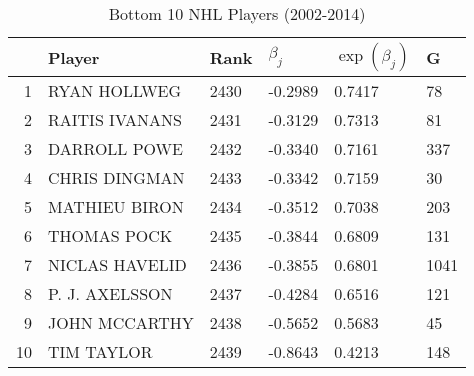 \begin{table}[ht]
\centering
\begin{tabular}{rlllll}
  \hline
 & Player & Rank & $\beta_j$ & $\exp(\beta_j)$ & G \\ 
  \hline
1 & RYAN HOLLWEG & 2430 & -0.2989 & 0.7417 & 78 \\ 
  2 & RAITIS IVANANS & 2431 & -0.3129 & 0.7313 & 81 \\ 
  3 & DARROLL POWE & 2432 & -0.3340 & 0.7161 & 337 \\ 
  4 & CHRIS DINGMAN & 2433 & -0.3342 & 0.7159 & 30 \\ 
  5 & MATHIEU BIRON & 2434 & -0.3512 & 0.7038 & 203 \\ 
  6 & THOMAS POCK & 2435 & -0.3844 & 0.6809 & 131 \\ 
  7 & NICLAS HAVELID & 2436 & -0.3855 & 0.6801 & 1041 \\ 
  8 & P. J. AXELSSON & 2437 & -0.4284 & 0.6516 & 121 \\ 
  9 & JOHN MCCARTHY & 2438 & -0.5652 & 0.5683 & 45 \\ 
  10 & TIM TAYLOR & 2439 & -0.8643 & 0.4213 & 148 \\ 
   \hline
\end{tabular}
\caption{Bottom 10 NHL Players (2002-2014)} 
\label{tab:worst10}
\end{table}
